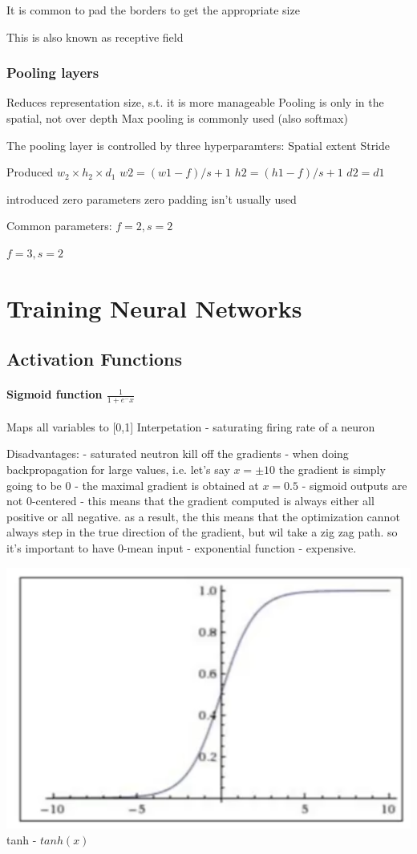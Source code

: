 It is common to pad the borders to get the appropriate size

This is also known as receptive field

\subsubsection{Pooling layers}

Reduces representation size, s.t. it is more manageable 
Pooling is only in the spatial, not over depth
Max pooling is commonly used (also softmax)

The pooling layer is controlled by three hyperparamters:
Spatial extent 
Stride 

Produced $w_2 \times h_2 \times d_1$
$w2 = (w1 - f)/s + 1$
$h2 = (h1 - f)/s + 1$
$d2 = d1$

introduced zero parameters
zero padding isn't usually used

Common parameters:
$f=2, s=2 $

$f=3, s=2$

\section{Training Neural Networks}

\subsection{Activation Functions}

\paragraph{Sigmoid function $\frac{1}{1+e^-x}$}
Maps all variables to [0,1]
Interpetation - saturating firing rate of a neuron 

Disadvantages:
- saturated neutron kill off the gradients - when doing backpropagation for large values, i.e. let's say $x = \pm10 $ the gradient is simply going to be 0 
- the maximal gradient is obtained at $x = 0.5$ 
- sigmoid outputs are not 0-centered - this means that the gradient computed is always either all positive or all negative. as a result, the this means that the optimization cannot always step in the true direction of the gradient, but wil take a zig zag path. so it's important to have 0-mean input
- exponential function - expensive.

\includegraphics[width=0.5\columnwidth]{fei_fei_li/lecture_06/sigmoid.png}
tanh - $tanh(x)$ 

